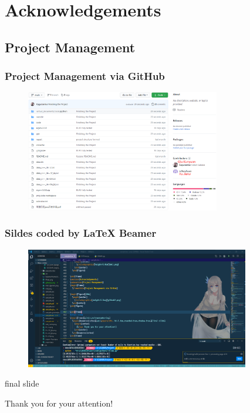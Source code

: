 \documentclass[cjk]{beamer}
\begin{document}
\section{Acknowledgements}
\subsection{Project Management}
\begin{frame}
  \frametitle{Project Management via GitHub}

  \begin{figure}[htb]
    \begin{center}
      \includegraphics[height=5.3cm]{github2.png}
    \end{center}
  \end{figure}

\end{frame}
\begin{frame}
  \frametitle{Sildes coded by LaTeX Beamer}

  \begin{figure}[htb]
    \begin{center}
      \includegraphics[height=5.3cm]{latex2.png}
    \end{center}
  \end{figure}

\end{frame}
\begin{frame}
  \begin{beamercolorbox}[wd=\paperwidth, ht=1.4cm,rounded=true,shadow=true]{final slide}
    \begin{center}
      {\huge Thank you for your attention!}
    \end{center}
  \end{beamercolorbox}
\end{frame}
\end{document}
